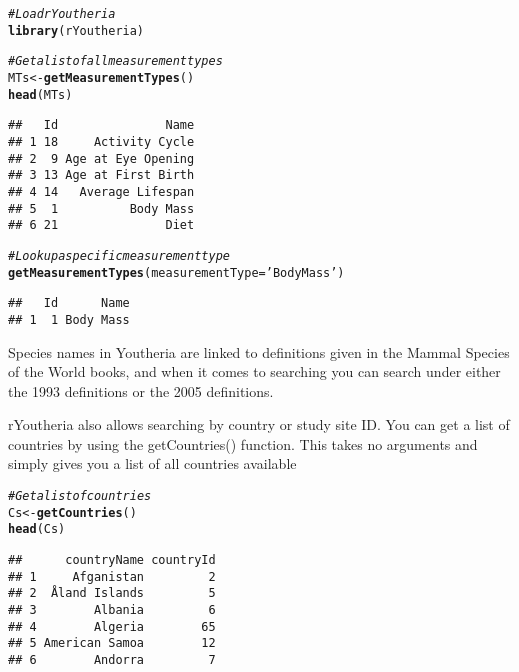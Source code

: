 \documentclass[a4paper]{article}\usepackage[]{graphicx}\usepackage[]{color}
\makeatletter
\newcommand{\hlstr}[1]{\textcolor[rgb]{0.192,0.494,0.8}{#1}}%
\newcommand{\hlcom}[1]{\textcolor[rgb]{0.678,0.584,0.686}{\textit{#1}}}%
\newcommand{\hlstd}[1]{\textcolor[rgb]{0.345,0.345,0.345}{#1}}%
\newcommand{\hlkwb}[1]{\textcolor[rgb]{0.69,0.353,0.396}{#1}}%
\newcommand{\hlkwc}[1]{\textcolor[rgb]{0.333,0.667,0.333}{#1}}%
\newcommand{\hlkwd}[1]{\textcolor[rgb]{0.737,0.353,0.396}{\textbf{#1}}}%
\newenvironment{kframe}{%
 \def\at@end@of@kframe{}%
 \ifinner\ifhmode%
  \def\at@end@of@kframe{\end{minipage}}%
  \begin{minipage}{\columnwidth}%
 \fi\fi%
 \def\FrameCommand##1{\hskip\@totalleftmargin \hskip-\fboxsep
 \colorbox{shadecolor}{##1}\hskip-\fboxsep
     \hskip-\linewidth \hskip-\@totalleftmargin \hskip\columnwidth}%
 \MakeFramed {\advance\hsize-\width
   \@totalleftmargin\z@ \linewidth\hsize
   \@setminipage}}%
 {\par\unskip\endMakeFramed%
 \at@end@of@kframe}
\newenvironment{knitrout}{}{} %
\makeatother
\begin{document}
\begin{knitrout}
\color{fgcolor}\begin{kframe}
\begin{alltt}
\hlcom{# Load rYoutheria}
\hlkwd{library}\hlstd{(rYoutheria)}
\end{alltt}


{\ttfamily\noindent\itshape\color{messagecolor}{\#\# Loading required package: plyr\\\#\# Loading required package: jsonlite\\\#\# Loading required package: reshape2\\\#\# Loading required package: RCurl\\\#\# Loading required package: bitops}}\begin{alltt}
\hlcom{# Get a list of all measurement types}
\hlstd{MTs} \hlkwb{<-} \hlkwd{getMeasurementTypes}\hlstd{()}
\hlkwd{head}\hlstd{(MTs)}
\end{alltt}
\begin{verbatim}
##   Id               Name
## 1 18     Activity Cycle
## 2  9 Age at Eye Opening
## 3 13 Age at First Birth
## 4 14   Average Lifespan
## 5  1          Body Mass
## 6 21               Diet
\end{verbatim}
\begin{alltt}
\hlcom{# Look up a specific measurement type}
\hlkwd{getMeasurementTypes}\hlstd{(}\hlkwc{measurementType}\hlstd{=}\hlstr{'Body Mass'}\hlstd{)}
\end{alltt}
\begin{verbatim}
##   Id      Name
## 1  1 Body Mass
\end{verbatim}
\end{kframe}
\end{knitrout}

Species names in Youtheria are linked to definitions given in the Mammal Species of the World books, and when it comes to searching you can search under either the 1993 definitions or the 2005 definitions.

rYoutheria also allows searching by country or study site ID. You can get a list of countries by using the getCountries() function. This takes no arguments and simply gives you a list of all countries available

\begin{knitrout}
\color{fgcolor}\begin{kframe}
\begin{alltt}
\hlcom{# Get a list of countries}
\hlstd{Cs} \hlkwb{<-} \hlkwd{getCountries}\hlstd{()}
\hlkwd{head}\hlstd{(Cs)}
\end{alltt}
\begin{verbatim}
##      countryName countryId
## 1     Afganistan         2
## 2  Åland Islands         5
## 3        Albania         6
## 4        Algeria        65
## 5 American Samoa        12
## 6        Andorra         7
\end{verbatim}
\end{kframe}
\end{knitrout}
\end{document}
